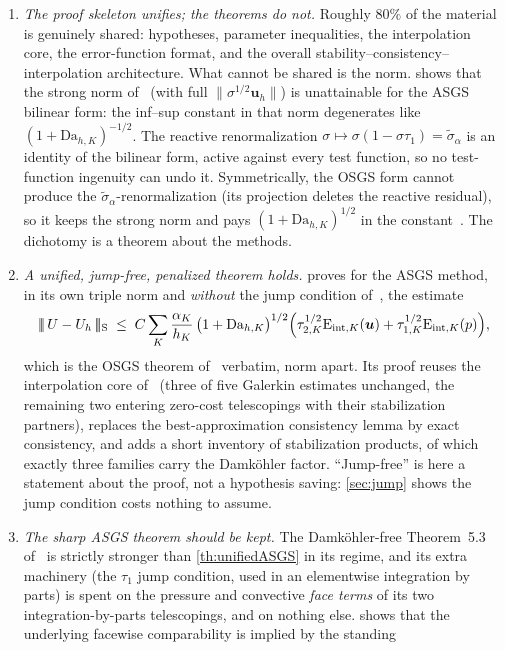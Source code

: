 \documentclass[11pt]{article}
\theoremstyle{remark}
\newcommand{\bu}{\boldsymbol{u}}
\newcommand{\norm}[1]{\lVert #1 \rVert}
\newcommand{\tnorm}[1]{\lvert\!\lvert\!\lvert\, #1 \,\rvert\!\rvert\!\rvert}
\newcommand{\Eint}[2]{\mathrm{E}_{\mathrm{int},#1}(#2)}
\newcommand{\Dah}{\mathrm{Da}_{h,K}}
\newcommand{\st}{\widetilde{\sigma}_\alpha}
\begin{document}
\begin{enumerate}[label=(\Roman*), leftmargin=2.5em, itemsep=0.4ex]
\item \emph{The proof skeleton unifies; the theorems do not.} Roughly $80\%$ of the
material is genuinely shared: hypotheses, parameter inequalities, the interpolation
core, the error-function format, and the overall
stability--consistency--interpolation architecture. What cannot be shared is the
norm.  shows that the strong norm of~\cite{OSGSnote} (with full
$\norm{\sigma^{1/2}\bu_h}$) is unattainable for the ASGS bilinear form: the inf--sup
constant in that norm degenerates like $(1+\Dah)^{-1/2}$. The reactive
renormalization $\sigma \mapsto \sigma(1-\sigma\tau_1) = \st$ is an identity of the
bilinear form, active against every test function, so no test-function ingenuity can
undo it. Symmetrically, the OSGS form cannot produce the $\st$-renormalization
(its projection deletes the reactive residual), so it keeps the strong norm and pays
$(1+\Dah)^{1/2}$ in the constant~\cite{OSGSnote}. The dichotomy is a theorem about
the methods.
\item \emph{A unified, jump-free, penalized theorem holds.}
 proves for the ASGS method, in its own triple norm and
\emph{without} the jump condition of~\cite{companion}, the estimate
\[
  \tnorm{U - U_h}_{\mathrm{S}}
  \;\le\;
  C \sum_K \frac{\alpha_K}{h_K}\,\bigl(1+\Dah\bigr)^{1/2}
  \Bigl( \tau_{2,K}^{1/2}\Eint{K}{\bu} + \tau_{1,K}^{1/2}\Eint{K}{p} \Bigr),
\]
which is the OSGS theorem of~\cite{OSGSnote} verbatim, norm apart. Its proof reuses
the interpolation core of~\cite{OSGSnote} (three of five Galerkin estimates
unchanged, the remaining two entering zero-cost telescopings with their
stabilization partners), replaces the best-approximation consistency lemma by exact
consistency, and adds a short inventory of stabilization products, of which exactly
three families carry the Damk\"ohler factor. ``Jump-free'' is here a statement about
the proof, not a hypothesis saving: \cref{sec:jump} shows the jump condition costs
nothing to assume.
\item \emph{The sharp ASGS theorem should be kept.} The Damk\"ohler-free Theorem~5.3
of~\cite{companion} is strictly stronger than \cref{th:unifiedASGS} in its regime,
and its extra machinery (the $\tau_1$ jump condition, used in an elementwise
integration by parts) is spent on the pressure and convective \emph{face terms} of
its two integration-by-parts telescopings, and on nothing else. 
shows that the underlying facewise comparability is implied by the standing

\end{enumerate}
\end{document}
